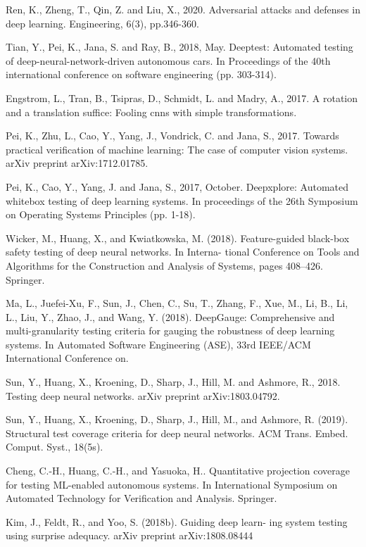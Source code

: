 \begin{singlespace}
\begin{thebibliography}{}
Ren, K., Zheng, T., Qin, Z. and Liu, X., 2020. Adversarial attacks and defenses in deep learning. Engineering, 6(3), pp.346-360.

Tian, Y., Pei, K., Jana, S. and Ray, B., 2018, May. Deeptest: Automated testing of deep-neural-network-driven autonomous cars. In Proceedings of the 40th international conference on software engineering (pp. 303-314).


Engstrom, L., Tran, B., Tsipras, D., Schmidt, L. and Madry, A., 2017. A rotation and a translation suffice: Fooling cnns with simple transformations.

Pei, K., Zhu, L., Cao, Y., Yang, J., Vondrick, C. and Jana, S., 2017. Towards practical verification of machine learning: The case of computer vision systems. arXiv preprint arXiv:1712.01785.

  
 Pei, K., Cao, Y., Yang, J. and Jana, S., 2017, October. Deepxplore: Automated whitebox testing of deep learning systems. In proceedings of the 26th Symposium on Operating Systems Principles (pp. 1-18).

 Wicker, M., Huang, X., and Kwiatkowska, M. (2018). Feature-guided black-box safety testing of deep neural networks. In Interna- tional Conference on Tools and Algorithms for the Construction and Analysis of Systems, pages 408–426. Springer.

 Ma, L., Juefei-Xu, F., Sun, J., Chen, C., Su, T., Zhang, F., Xue, M., Li, B., Li, L., Liu, Y., Zhao, J., and Wang, Y. (2018). DeepGauge: Comprehensive and multi-granularity testing criteria for gauging the robustness of deep learning systems. In Automated Software Engineering (ASE), 33rd IEEE/ACM International Conference on.

    
Sun, Y., Huang, X., Kroening, D., Sharp, J., Hill, M. and Ashmore, R., 2018. Testing deep neural networks. arXiv preprint arXiv:1803.04792.

 Sun, Y., Huang, X., Kroening, D., Sharp, J., Hill, M., and Ashmore, R. (2019). Structural test coverage criteria for deep neural networks. ACM Trans. Embed. Comput. Syst., 18(5s).

Cheng, C.-H., Huang, C.-H., and Yasuoka, H.. Quantitative projection coverage for testing ML-enabled autonomous systems. In International Symposium on Automated Technology for Verification and Analysis. Springer.

 Kim, J., Feldt, R., and Yoo, S. (2018b). Guiding deep learn- ing system testing using surprise adequacy. arXiv preprint arXiv:1808.08444


\end{thebibliography}
\end{singlespace}
